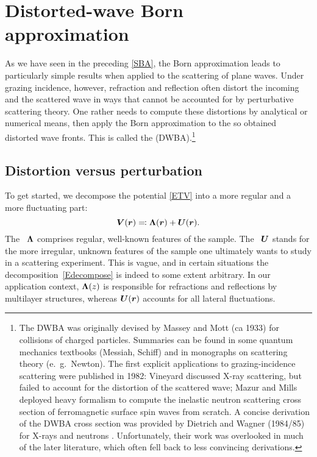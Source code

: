 \section{Distorted-wave Born approximation}\label{SDWBA}

As we have seen in the preceding \cref{SBA},
the Born approximation leads to particularly simple results when applied
to the scattering of plane waves.
Under grazing incidence, however,
refraction
%
and reflection
%
often distort the incoming and the scattered wave in ways
that cannot be accounted for by perturbative scattering theory.
One rather needs to compute these distortions by analytical or numerical means,
then apply the Born approximation to the so obtained distorted wave fronts.
This is called the
%
 (DWBA).\footnote
{The DWBA was originally devised by Massey and Mott (ca 1933)
for collisions of charged particles.
Summaries can be found in some quantum mechanics textbooks (Messiah, Schiff)
and in monographs on scattering theory (e.~g.\ Newton).
The first explicit applications to grazing-incidence scattering
were published in 1982:
Vineyard \cite{Vin82} discussed X-ray scattering,
but failed to account for the distortion of the scattered wave;
Mazur and Mills \cite{MaMi82} deployed heavy formalism
to compute the inelastic neutron scattering cross section
of ferromagnetic surface spin waves from scratch.
A concise derivation of the DWBA cross section
was provided by Dietrich and Wagner (1984/85)
for X-rays \cite{DiWa84} and neutrons \cite{DiWa85}.
Unfortunately, their work was overlooked in much of the later literature,
which often fell back to less convincing derivations.}

\subsection{Distortion versus perturbation}\label{Sdecompose}

To get started,
we decompose the potential \cref{ETV}
into a more regular and a more fluctuating part:
\begin{equation}\label{Edecompose}
  \TV(\r) \eqqcolon \TL(\r) + \TU(\r).
\end{equation}
The ~$\bm{\Lambda}$
%
%
comprises regular, well-known features of the sample.
The ~$\bm{U}$
%
%
%
stands for the more irregular, unknown features of the sample
one ultimately wants to study in a scattering experiment.
This is vague,
and in certain situations the decomposition~\cref{Edecompose} is indeed
to some extent arbitrary.
In our application context,
$\bm{\Lambda}(z)$ is responsible for refractions and reflections
by multilayer structures,
whereas $\bm{U}(\bm{r})$ accounts for all lateral fluctuations.

